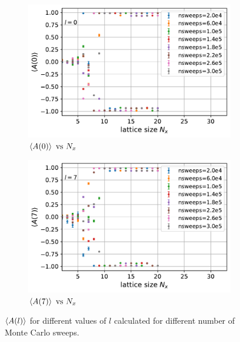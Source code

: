 \documentclass[../journal_main.tex]{subfiles}
\begin{document}
\begin{figure}[!htb]
    \centering
    \begin{subfigure}[b]{0.47\textwidth}
        \centering
        \includegraphics[width=\textwidth]{images/expval(A_l)_vs_N_x/A vs N_x (l=0).pdf}
        \caption{$\expval{A(0)} \text{ vs } N_x$}
    \end{subfigure}
    \hspace{1em}  %
    \begin{subfigure}[b]{0.47\textwidth}
        \centering
        \includegraphics[width=\textwidth]{images/expval(A_l)_vs_N_x/A vs N_x (l=7).pdf}
        \caption{$\expval{A(7)} \text{ vs } N_x$}
    \end{subfigure}
    \caption{$\expval{A(l)}$ for different values of $l$ calculated for different number of Monte Carlo sweeps.}
    \label{expvalA(l)_vs_N_x}
\end{figure}
\end{document}
